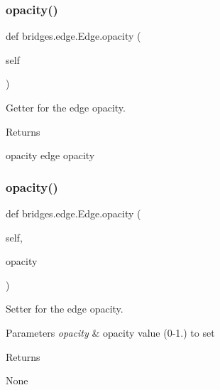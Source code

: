 \subsubsection{\texorpdfstring{opacity()}{opacity()}\hspace{0.1cm}{\footnotesize\ttfamily [1/2]}}
{\footnotesize\ttfamily def bridges.\+edge.\+Edge.\+opacity (\begin{DoxyParamCaption}\item[{}]{self }\end{DoxyParamCaption})}



Getter for the edge opacity. 

\begin{DoxyReturn}{Returns}


opacity edge opacity 
\end{DoxyReturn}
\mbox{\label{classbridges_1_1edge_1_1_edge_aa2dca1c00c4d2ec377cdb0dd8eefd93d}} 
\subsubsection{\texorpdfstring{opacity()}{opacity()}\hspace{0.1cm}{\footnotesize\ttfamily [2/2]}}
{\footnotesize\ttfamily def bridges.\+edge.\+Edge.\+opacity (\begin{DoxyParamCaption}\item[{}]{self,  }\item[{}]{opacity }\end{DoxyParamCaption})}



Setter for the edge opacity. 


\begin{DoxyParams}{Parameters}
{\em opacity} & opacity value (0-\/1.) to set \\
\hline
\end{DoxyParams}
\begin{DoxyReturn}{Returns}


None 
\end{DoxyReturn}
\mbox{\label{classbridges_1_1edge_1_1_edge_a70271a1d9eaf4b6bdda3179b6821703e}} 
